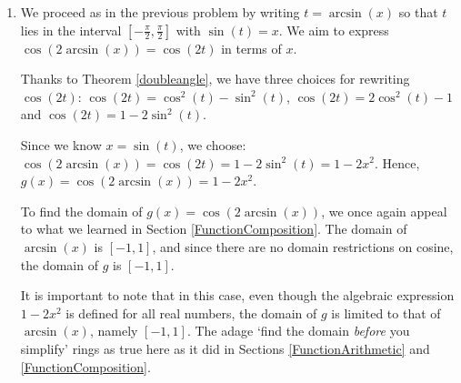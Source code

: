 \documentclass{ximera}
\begin{document}
\begin{example}
\begin{explanation}
\begin{enumerate}
\begin{enumerate}
 

Since the domain of $\arccos(x)$ is $-1 \leq x \leq 1$, the domain of $f$ will be some subset of $[-1,1]$.  The range of  $\arccos(x)$ is $[0,\pi]$, and of these values, only  $\frac{\pi}{2}$ will cause a problem for the tangent function.  Since $\arccos(x) = \frac{\pi}{2}$ happens when $x = \cos\left(\frac{\pi}{2} \right) = 0$, we exclude $x=0$ from our domain.  Hence, the domain of  $f(x) = \tan\left(\arccos\left(x \right)\right) =\frac{\sqrt{1-x^2}}{x}$  is  $[-1,0)\cup(0,1]$.  

 

Note that \textit{in this particular case}, we could have obtained the correct domain of $f$ using its algebraic description:  $f(x) = \tan(\arccos(x)) =  \frac{\sqrt{1-x^2}}{x}$.  This is not always true, however, as we'll see in the next problem.

\item We proceed as in the previous problem by writing $t = \arcsin(x)$ so that $t$ lies in the interval $\left[ -\frac{\pi}{2}, \frac{\pi}{2}\right]$ with $\sin(t) = x$.  We aim to express $\cos\left(2 \arcsin(x)\right) = \cos(2t)$ in terms of $x$.  

 

Thanks to Theorem \ref{doubleangle}, we have three choices for rewriting $\cos(2t)$:  $\cos(2t) = \cos^{2}(t) - \sin^{2}(t)$, $ \cos(2t) = 2\cos^{2}(t) - 1$ and $\cos(2t) = 1 - 2\sin^{2}(t)$.  

 

Since we know $x = \sin(t)$, we choose: $\cos\left(2 \arcsin(x)\right) = \cos(2t)  = 1 - 2\sin^{2}(t) = 1 - 2x^2$.  Hence, $g(x) = \cos\left(2 \arcsin(x)\right) = 1 - 2x^2$.

 

To find the domain of $g(x) = \cos\left(2 \arcsin(x)\right)$, we once again appeal to what we learned in Section \ref{FunctionComposition}.  The domain of $\arcsin(x)$ is  $[-1,1]$, and since there are no domain restrictions on cosine, the domain of $g$ is $[-1,1]$.  
 

It is important to note that in this case, even though the algebraic expression $1-2x^2$ is defined for all real numbers, the domain of $g$ is limited to that of $\arcsin(x)$, namely $[-1,1]$. The adage `find the domain \textit{before} you simplify' rings as true here as it did in Sections \ref{FunctionArithmetic} and \ref{FunctionComposition}. 

\end{enumerate}

\end{enumerate}
\end{explanation}
\end{example}
\end{document}
